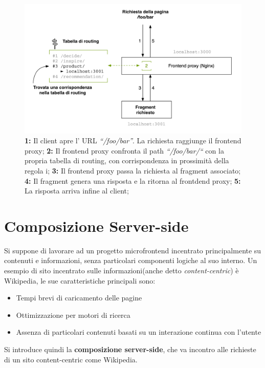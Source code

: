 \begin{figure}[H]
    \centering
    \includegraphics[width=140mm]{img/frontend proxy}
    \caption{  
        \textbf{1:} Il client apre l’ URL \emph{“/foo/bar”}. La richiesta raggiunge il frontend proxy;
        \textbf{2:} Il frontend proxy confronta il path \emph{“/foo/bar/“} con la propria tabella di routing, con corrispondenza in prossimità della regola i;
        \textbf{3:} Il frontend proxy passa la richiesta al fragment associato;
        \textbf{4:} Il fragment genera una risposta e la ritorna al frontdend proxy;
        \textbf{5:} La risposta arriva infine al client;
   }
  \end{figure}


\pagebreak

\section{Composizione Server-side}
Si suppone di lavorare ad un progetto microfrontend incentrato principalmente su contenuti e informazioni, senza particolari componenti logiche al suo interno.
Un esempio di sito incentrato sulle informazioni(anche detto \emph{content-centric}) è Wikipedia, le sue caratteristiche principali sono:
\begin{itemize}
    \item Tempi brevi di caricamento delle pagine
    \item Ottimizzazione per motori di ricerca
    \item Assenza di particolari contenuti basati su un interazione continua con l'utente
\end{itemize}

Si introduce quindi la \textbf{composizione server-side}, che va incontro alle richieste di un sito content-centric come Wikipedia.

